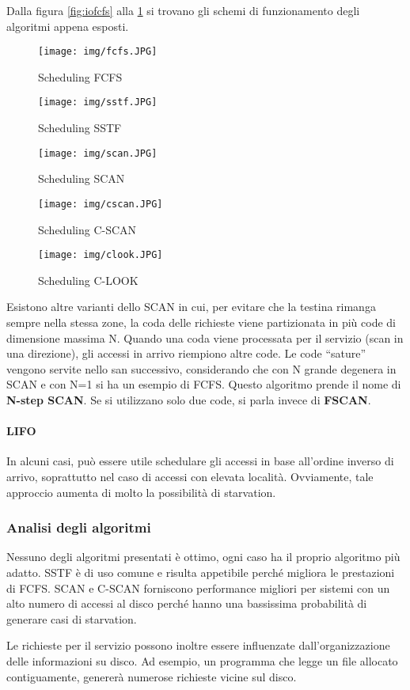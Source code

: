\documentclass[a4paper]{article}
\begin{document}
Dalla figura \ref{fig:iofcfs} alla \ref{fig:ioclook} si trovano gli schemi di funzionamento degli algoritmi appena esposti.

\begin{figure}
    \centering
    \texttt{[image: img/fcfs.JPG]}
    \label{fig:iofcfs}
    \caption{Scheduling FCFS}
    \texttt{[image: img/sstf.JPG]}
    \caption{Scheduling SSTF}
    \texttt{[image: img/scan.JPG]}
    \caption{Scheduling SCAN}
    \texttt{[image: img/cscan.JPG]}
    \caption{Scheduling C-SCAN}
    \texttt{[image: img/clook.JPG]}
    \caption{Scheduling C-LOOK}
    \label{fig:ioclook}
\end{figure}

Esistono altre varianti dello SCAN in cui, per evitare che la testina rimanga sempre nella stessa zone, la coda delle richieste viene partizionata in più code di dimensione massima N. Quando una coda viene processata per il servizio (scan in una direzione), gli accessi in arrivo riempiono altre code. Le code ``sature'' vengono servite nello san successivo, considerando che con N grande degenera in SCAN e con N=1 si ha un esempio di FCFS. Questo algoritmo prende il nome di \textbf{N-step SCAN}. Se si utilizzano solo due code, si parla invece di \textbf{FSCAN}.

\paragraph{LIFO} In alcuni casi, può essere utile schedulare gli accessi in base all'ordine inverso di arrivo, soprattutto nel caso di accessi con elevata località. Ovviamente, tale approccio aumenta di molto la possibilità di starvation.

\subsubsection{Analisi degli algoritmi}
Nessuno degli algoritmi presentati è ottimo, ogni caso ha il proprio algoritmo più adatto. SSTF è di uso comune e risulta appetibile perché migliora le prestazioni di FCFS. SCAN e C-SCAN forniscono performance migliori per sistemi con un alto numero di accessi al disco perché hanno una bassissima probabilità di generare casi di starvation.

Le richieste per il servizio possono inoltre essere influenzate dall'organizzazione delle informazioni su disco. Ad esempio, un programma che legge un file allocato contiguamente, genererà numerose richieste vicine sul disco.
\end{document}

